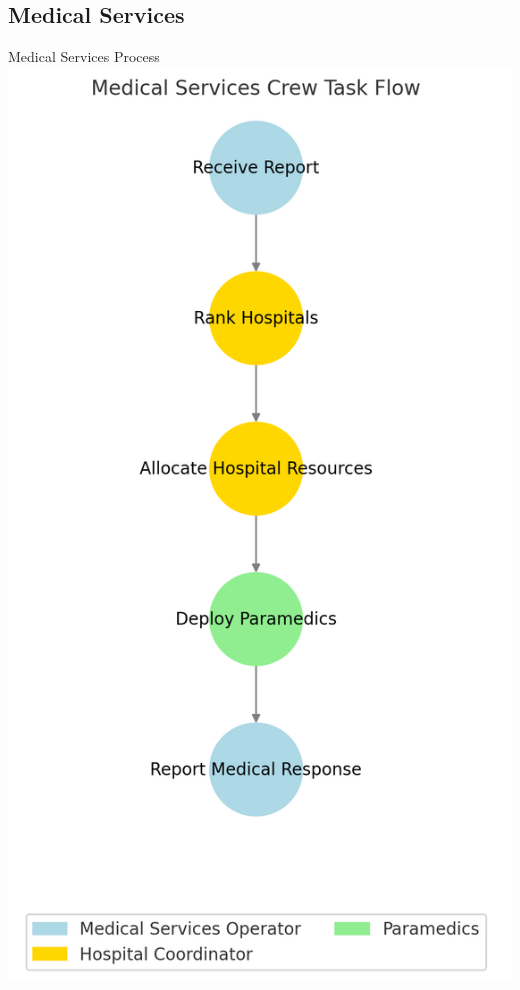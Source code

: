 \subsection{Medical Services}
\begin{frame}{Medical Services Process}
    \centering
    \includegraphics[height=\textheight]{figures/Medical_Services_Crew_Flow.png} 
\end{frame}

